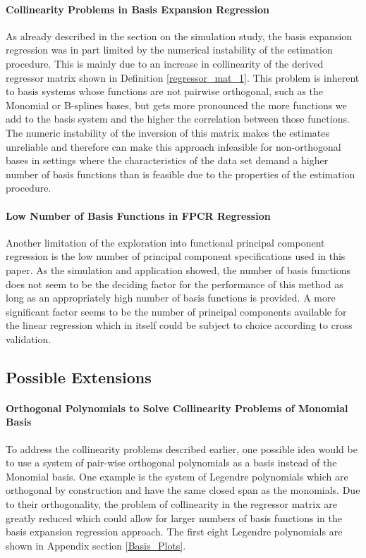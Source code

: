 \documentclass[11pt,twoside,a4paper]{article}
\begin{document}
	\paragraph{Collinearity Problems in Basis Expansion Regression}
	As already described in the section on the simulation study, the basis expansion regression was in part limited by the numerical instability of the estimation procedure. This is mainly due to an increase in collinearity of the derived regressor matrix shown in Definition \ref{regressor_mat_1}. This problem is inherent to basis systems whose functions are not pairwise orthogonal, such as the Monomial or B-splines bases, but gets more pronounced the more functions we add to the basis system and the higher the correlation between those functions. \\
	The numeric instability of the inversion of this matrix makes the estimates unreliable and therefore can make this approach infeasible for non-orthogonal bases in settings where the characteristics of the data set demand a higher number of basis functions than is feasible due to the properties of the estimation procedure.
	\vspace{-0.2cm}
	
	\paragraph{Low Number of Basis Functions in FPCR Regression}
	Another limitation of the exploration into functional principal component regression is the low number of principal component specifications used in this paper. As the simulation and application showed, the number of basis functions does not seem to be the deciding factor for the performance of this method as long as an appropriately high number of basis functions is provided. 
	A more significant factor seems to be the number of principal components available for the linear regression which in itself could be subject to choice according to cross validation.
	\vspace{-0.2cm}
	
	\subsection*{Possible Extensions}
	
	\paragraph{Orthogonal Polynomials to Solve Collinearity Problems of Monomial Basis}
	To address the collinearity problems described earlier, one possible idea would be to use a system of pair-wise orthogonal polynomials as a basis instead of the Monomial basis. One example is the system of Legendre polynomials which are orthogonal by construction and have the same closed span as the monomials. Due to their orthogonality, the problem of collinearity in the regressor matrix are greatly reduced which could allow for larger numbers of basis functions in the basis expansion regression approach. The first eight Legendre polynomials are shown in Appendix section \ref{Basis_Plots}.
	\vspace{-0.2cm}
	
\end{document}
